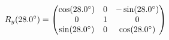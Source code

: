 \documentclass[preview]{standalone}
\begin{document}
\begin{align*}
\special{dvisvgm:raw <g id='unique000'>}R_y(28.0^\circ) = \begin{pmatrix} \cos(28.0^\circ) & 0 & -\sin(28.0^\circ) \\ 0 & 1 & 0 \\ \sin(28.0^\circ) & 0 & \cos(28.0^\circ) \end{pmatrix}\special{dvisvgm:raw </g>}
\end{align*}
\end{document}
